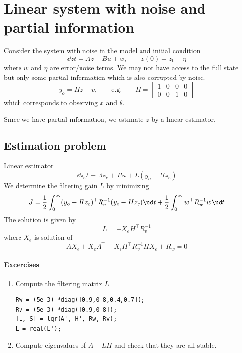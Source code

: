 \documentclass[12pt]{article}
\begin{document}

\section{Linear system with noise and partial information}
Consider the system with noise in the model and initial condition
\[
\dd{z}{t} = Az + Bu + w, \qquad z(0) = z_0 + \eta
\]
where $w$ and $\eta$ are error/noise terms. We may not have access to the full state but only some partial information which is also corrupted by noise.
\[
y_o = Hz  + v, \qquad \textrm{e.g.} \qquad H = \begin{bmatrix}
1 & 0 & 0 & 0 \\
0 & 0 & 1 & 0 \end{bmatrix}
\]
which corresponds to observing $x$ and $\theta$.

\vspace{5mm}

Since we have partial information, we estimate $z$ by a linear estimator.

\subsection{Estimation problem}
Linear estimator
\[
\dd{z_e}{t} = A z_e + Bu + L(y_o - H z_e)
\]
We determine the filtering gain $L$ by minimizing
\[
J = \frac{1}{2} \int_0^\infty (y_o - H z_e)^\top R_v^{-1} (y_o - H z_e) \ud t +            \frac{1}{2} \int_0^\infty w^\top R_w^{-1} w \ud t
\]
The solution is given by
\[
L = - X_e H^\top R_v^{-1}
\]
where $X_e$ is solution of
\[
A X_e + X_e A^\top - X_e H^\top R_v^{-1}  H X_e + R_w = 0
\]

\paragraph{Excercises}

\begin{enumerate}

\item Compute the filtering matrix $L$
\begin{lstlisting}
Rw = (5e-3) *diag([0.9,0.8,0.4,0.7]);
Rv = (5e-3) *diag([0.9,0.8]);
[L, S] = lqr(A', H', Rw, Rv);
L = real(L');
\end{lstlisting}

\item Compute eigenvalues of $A-LH$ and check that they are all stable.

\end{enumerate}
\end{document}
